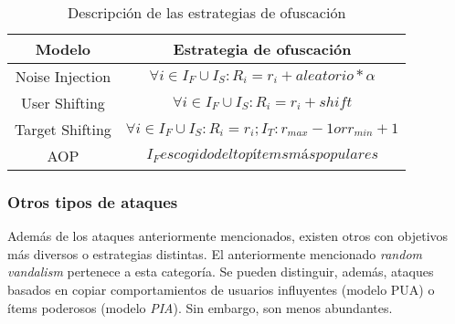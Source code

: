 \begin{table}
	
	\centering
	\resizebox{15cm}{!} {
		\begin{tabular}{|c c|}
			\hline
			
			Modelo & Estrategia de ofuscación\\\hline \hline
			
			Noise Injection & $\forall i \in I_F \cup I_S: R_i = r_i + aleatorio * \alpha $\\\hline 
			User Shifting & $\forall i \in I_F \cup I_S: R_i = r_i + shift $\\\hline 
			Target Shifting & $\forall i \in I_F \cup I_S: R_i = r_i; I_T: r_{max}-1 or r_{min}+1 $\\\hline 
			AOP & $I_F escogido del top ítems más populares$\\\hline 
			
		\end{tabular}
	}
	
	\caption{Descripción de las estrategias de ofuscación}
	\label{tabla_descripcion_estrategias_ofuscación}
	
\end{table}

\subsubsection{Otros tipos de ataques}

Además de los ataques anteriormente mencionados, existen otros con objetivos más diversos o estrategias distintas. El anteriormente mencionado \textit{random vandalism} pertenece a esta categoría. Se pueden distinguir, además, ataques basados en copiar comportamientos de usuarios influyentes (modelo PUA) o ítems poderosos (modelo \textit{PIA}). Sin embargo, son menos abundantes.


